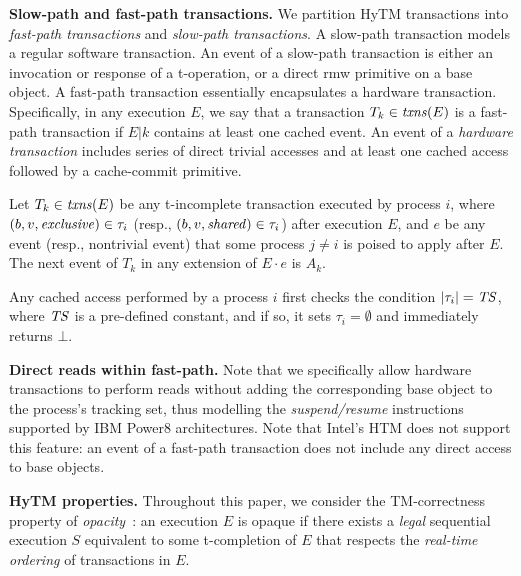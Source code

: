 \vspace{1mm}\noindent\textbf{Slow-path and fast-path transactions.}
We partition HyTM transactions into \emph{fast-path transactions} and \emph{slow-path transactions}.
A slow-path transaction models a regular software transaction.
An event of a slow-path transaction is either an invocation or response of a t-operation, or
a direct rmw primitive on a base object. 
A fast-path transaction essentially encapsulates a hardware transaction. Specifically, in any execution $E$,
we say that a transaction $T_k\in \ms{txns}(E)$ is a fast-path transaction if $E|k$ contains at least one cached event.
An event of a \emph{hardware transaction} includes series of direct trivial accesses and at least one cached access
followed by a cache-commit primitive.
%
\begin{remark}
\label{re:traborts}
%
Let $T_k \in \ms{txns}(E)$ be any t-incomplete transaction executed by process $i$, 
where $(b,v,\mathit{exclusive})\in\tau_i$ (resp., $(b,v,\mathit{shared})\in\tau_i$) after execution $E$, and $e$ be any event (resp., nontrivial event) 
that some process $j\neq i$ is poised to apply after $E$.
The next event of $T_k$ in any extension of $E\cdot e$ is $A_k$.
%
\end{remark}
%
%
\begin{remark}
\label{re:capacity}
Any cached access performed by a process $i$ first checks the condition $|\tau_i|=\mathit{TS}$, where $\mathit{TS}$ is a pre-defined constant, and if so, it
sets $\tau_i=\emptyset$ and immediately returns $\bot$. 
\end{remark}

\vspace{1mm}\noindent\textbf{Direct reads within fast-path.}
Note that we specifically allow hardware transactions to perform reads without adding the corresponding base object to
the process's tracking set, thus modelling the \emph{suspend/resume} instructions supported by 
IBM Power8 architectures. Note that Intel's HTM does not support this feature: an event of a fast-path transaction
does not include any direct access to base objects.

%
\vspace{1mm}\noindent\textbf{HyTM properties.}
Throughout this paper, we consider the TM-correctness property of \emph{opacity}~\cite{tm-book}: an execution
$E$ is opaque if there exists a \emph{legal} sequential execution $S$ equivalent to some t-completion of $E$
that respects the \emph{real-time ordering} of transactions in $E$.


